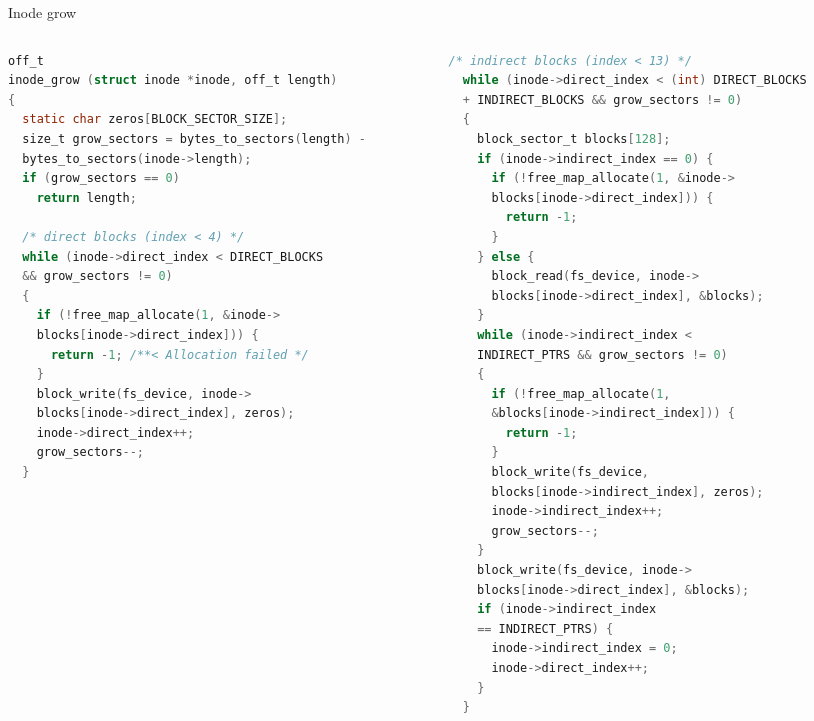 \documentclass[10pt]{beamer}
\begin{document}
\begin{frame}[fragile]{Inode grow}
\begin{columns}
\begin{column}{0.5\textwidth}
\begin{lstlisting}[language=C]
off_t
inode_grow (struct inode *inode, off_t length)
{
  static char zeros[BLOCK_SECTOR_SIZE];
  size_t grow_sectors = bytes_to_sectors(length) - 
  bytes_to_sectors(inode->length);
  if (grow_sectors == 0)
    return length;

  /* direct blocks (index < 4) */
  while (inode->direct_index < DIRECT_BLOCKS
  && grow_sectors != 0)
  {
    if (!free_map_allocate(1, &inode->
    blocks[inode->direct_index])) {
      return -1; /**< Allocation failed */
    }
    block_write(fs_device, inode->
    blocks[inode->direct_index], zeros);
    inode->direct_index++;
    grow_sectors--;
  }
\end{lstlisting}
\end{column}
\begin{column}{0.5\textwidth}
\begin{lstlisting}[language=C]
/* indirect blocks (index < 13) */
  while (inode->direct_index < (int) DIRECT_BLOCKS 
  + INDIRECT_BLOCKS && grow_sectors != 0)
  {
    block_sector_t blocks[128];
    if (inode->indirect_index == 0) {
      if (!free_map_allocate(1, &inode->
      blocks[inode->direct_index])) {
        return -1;
      }
    } else {
      block_read(fs_device, inode->
      blocks[inode->direct_index], &blocks);
    }
    while (inode->indirect_index < 
    INDIRECT_PTRS && grow_sectors != 0)
    {
      if (!free_map_allocate(1, 
      &blocks[inode->indirect_index])) {
        return -1;
      }
      block_write(fs_device, 
      blocks[inode->indirect_index], zeros);
      inode->indirect_index++;
      grow_sectors--;
    }
    block_write(fs_device, inode->
    blocks[inode->direct_index], &blocks);
    if (inode->indirect_index 
    == INDIRECT_PTRS) {
      inode->indirect_index = 0;
      inode->direct_index++;
    }
  }
\end{lstlisting}
\end{column}
\end{columns}
\end{frame}
\end{document}
